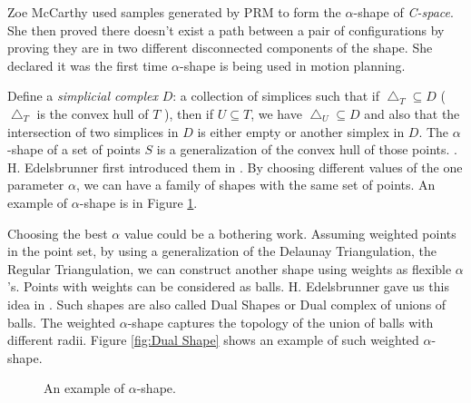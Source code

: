 \documentclass[11pt]{article}
\begin{document}
\indent Zoe McCarthy \cite{PathNonexistance} used samples generated by PRM to form the $\alpha$-shape of \emph{C-space}. She then proved there doesn't exist a path between a pair of configurations by proving they are in two different disconnected components of the shape. She declared it was the first time $\alpha$-shape is being used in motion planning.

\indent Define a \emph{simplicial complex} $D$: a collection of simplices such that if $\bigtriangleup_T \subseteq D$ ( $\bigtriangleup_T$ is the convex hull of $T$ ), then if $U \subseteq T$, we have $\bigtriangleup_U \subseteq D$ and also that the intersection of two simplices in $D$ is either empty or another simplex in $D$. The $\alpha$-shape of a set of points $S$ is a generalization of the convex hull of those points. \cite{PathNonexistance}. H. Edelsbrunner first introduced them in \cite{PointSetShape}. By choosing different values of the one parameter $\alpha$, we can have a family of shapes with the same set of points. An example of $\alpha$-shape is in Figure \ref{fig:Alpha-shape}.

\indent Choosing the best $\alpha$ value could be a bothering work. Assuming weighted points in the point set, by using a generalization of the Delaunay Triangulation, the Regular Triangulation, we can construct another shape using weights as flexible $\alpha$'s. Points with weights can be considered as balls. H. Edelsbrunner gave us this idea in \cite{DualShape}. Such shapes are also called Dual Shapes or Dual complex of unions of balls. The weighted $\alpha$-shape captures the topology of the union of balls with different radii. Figure \ref{fig:Dual Shape} shows an example of such weighted $\alpha$-shape.

\begin{figure}
	\caption{\label{fig:Alpha-shape} An example of $\alpha$-shape. \cite{PointSetShape}}
\end{figure}
\end{document}
